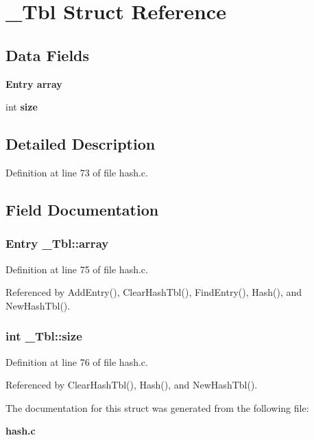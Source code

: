 \section{\_\-Tbl Struct Reference}
\label{struct__Tbl}
\subsection*{Data Fields}
\begin{CompactItemize}
\item 
\bf{Entry} \bf{array}
\item 
int \bf{size}
\end{CompactItemize}


\subsection{Detailed Description}




Definition at line 73 of file hash.c.

\subsection{Field Documentation}
\subsubsection{\setlength{\rightskip}{0pt plus 5cm}\bf{Entry} \bf{\_\-Tbl::array}}\label{struct__Tbl_9ee0479f892803f61977803222d2244d}




Definition at line 75 of file hash.c.

Referenced by Add\-Entry(), Clear\-Hash\-Tbl(), Find\-Entry(), Hash(), and New\-Hash\-Tbl().
\subsubsection{\setlength{\rightskip}{0pt plus 5cm}int \bf{\_\-Tbl::size}}\label{struct__Tbl_c3fcbf5734777dde69d7c20455e2319a}




Definition at line 76 of file hash.c.

Referenced by Clear\-Hash\-Tbl(), Hash(), and New\-Hash\-Tbl().

The documentation for this struct was generated from the following file:\begin{CompactItemize}
\item 
\bf{hash.c}\end{CompactItemize}
